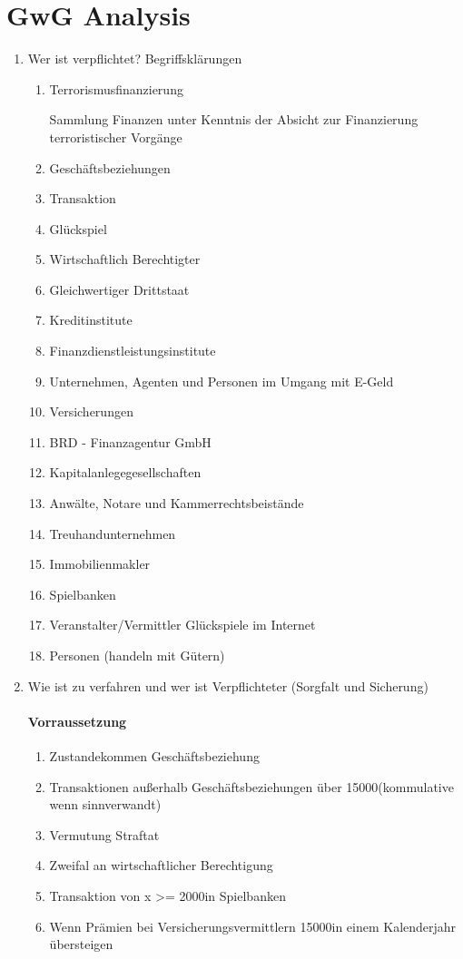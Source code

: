 \documentclass{article}
\begin{document}
\section[GwG]{GwG Analysis}
\begin{enumerate}
	\item Wer ist verpflichtet? Begriffsklärungen
		\begin{enumerate}
			\item Terrorismusfinanzierung

				Sammlung Finanzen unter Kenntnis der Absicht zur Finanzierung terroristischer Vorgänge

			\item Geschäftsbeziehungen
			\item Transaktion
			\item Glückspiel
			\item Wirtschaftlich Berechtigter
			\item Gleichwertiger Drittstaat
			\item Kreditinstitute
			\item Finanzdienstleistungsinstitute
			\item Unternehmen, Agenten und Personen im Umgang mit E-Geld
			\item Versicherungen
			\item BRD - Finanzagentur GmbH
			\item Kapitalanlegegesellschaften
			\item Anwälte, Notare und Kammerrechtsbeistände
			\item Treuhandunternehmen
			\item Immobilienmakler
			\item Spielbanken
			\item Veranstalter/Vermittler Glückspiele im Internet
			\item Personen (handeln mit Gütern)
		\end{enumerate}
	\item Wie ist zu verfahren und wer ist Verpflichteter (Sorgfalt und Sicherung)
		\paragraph{Vorraussetzung}
			\begin{enumerate}
				\item Zustandekommen Geschäftsbeziehung
				\item Transaktionen außerhalb Geschäftsbeziehungen über 15000\texteuro (kommulative wenn sinnverwandt)
				\item Vermutung Straftat
				\item Zweifal an wirtschaftlicher Berechtigung
				\item Transaktion von x >= 2000\texteuro in Spielbanken
				\item Wenn Prämien bei Versicherungsvermittlern 15000\texteuro in einem Kalenderjahr übersteigen
			\end{enumerate}


\end{enumerate}
\end{document}
